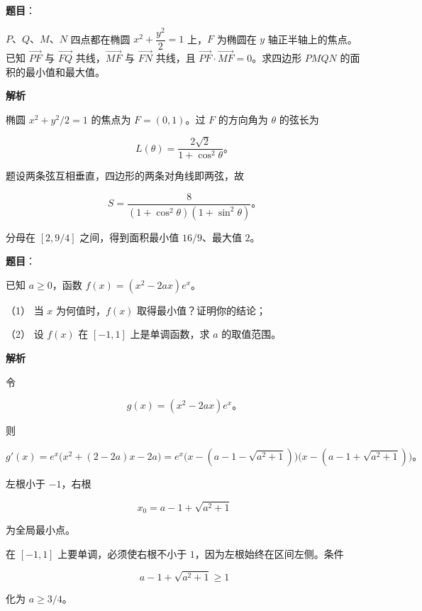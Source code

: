 \begin{answer}

\textbf{题目}：

$P\text{、}Q\text{、}M\text{、}N$ 四点都在椭圆 $x^2+\dfrac{y^2}{2}=1$ 上，$F$ 为椭圆在 $y$ 轴正半轴上的焦点。已知 $\overrightarrow{PF}$ 与 $\overrightarrow{FQ}$ 共线，$\overrightarrow{MF}$ 与 $\overrightarrow{FN}$ 共线，且 $\overrightarrow{PF}\cdot\overrightarrow{MF}=0$。求四边形 $PMQN$ 的面积的最小值和最大值。

\textbf{解析}

椭圆 $x^2+y^2/2=1$ 的焦点为 $F=(0,1)$。过 $F$ 的方向角为 $\theta$ 的弦长为

\nopagebreak[4]
\[
L(\theta)=\frac{2\sqrt2}{1+\cos^2\theta}\text{。}
\]

题设两条弦互相垂直，四边形的两条对角线即两弦，故

\nopagebreak[4]
\[
S=\frac8{(1+\cos^2\theta)(1+\sin^2\theta)}\text{。}
\]

分母在 $[2,9/4]$ 之间，得到面积最小值 $16/9$、最大值 $2$。


\end{answer}
\begin{answer}

\textbf{题目}：

已知 $a\geqslant0$，函数 $f(x)=(x^2-2ax)e^x$。

（1） 当 $x$ 为何值时，$f(x)$ 取得最小值？证明你的结论；

（2） 设 $f(x)$ 在 $[-1,1]$ 上是单调函数，求 $a$ 的取值范围。

\textbf{解析}


令

\nopagebreak[4]
\[
g(x)=(x^2-2ax)e^x\text{。}
\]

则

\nopagebreak[4]
\[
g'(x)=e^x\bigl(x^2+(2-2a)x-2a\bigr)
=e^x\bigl(x-(a-1-\sqrt{a^2+1})\bigr)
\bigl(x-(a-1+\sqrt{a^2+1})\bigr)\text{。}
\]

左根小于 $-1$，右根

\nopagebreak[4]
\[
x_0=a-1+\sqrt{a^2+1}
\]

为全局最小点。


在 $[-1,1]$ 上要单调，必须使右根不小于 $1$，因为左根始终在区间左侧。条件

\nopagebreak[4]
\[
a-1+\sqrt{a^2+1}\geqslant1
\]

化为 $a\geqslant3/4$。



\end{answer}